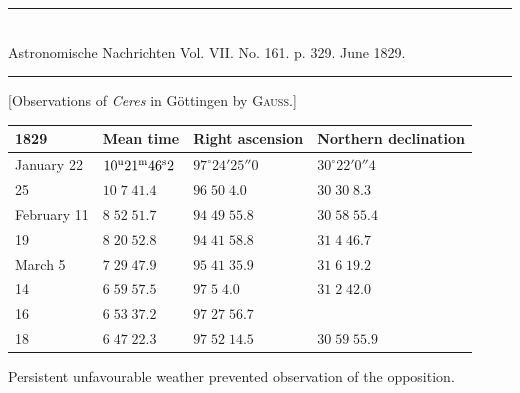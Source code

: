 \clearpage
{}
\begin{center}
\rule{0.55\linewidth}{0.4pt}\\[2pt]
Astronomische Nachrichten Vol. VII. No. 161. p. 329. June 1829.\\[2pt]
\rule{0.55\linewidth}{0.4pt}
\end{center}

\begin{center}[Observations of \emph{Ceres} in Göttingen by \textsc{Gauss.}]\end{center}

\begin{center}
\begin{tabular}{l|l|l|l}
1829 & Mean time & Right ascension & Northern declination \\
\hline
January 22 & $10^{\rm u}21^{\rm m}46^{\rm s}2$ & $97^\circ24'25''0$ & $30^\circ22'0''4$ \\
\hfill 25 & $10\;7\;41.4$ & $96\;50\;4.0$ & $30\;30\;8.3$ \\
February 11 & $8\;52\;51.7$ & $94\;49\;55.8$ & $30\;58\;55.4$ \\
\hfill 19 & $8\;20\;52.8$ & $94\;41\;58.8$ & $31\;4\;46.7$ \\
March 5 & $7\;29\;47.9$ & $95\;41\;35.9$ & $31\;6\;19.2$ \\
\hfill 14 & $6\;59\;57.5$ & $97\;5\;4.0$ & $31\;2\;42.0$ \\
\hfill 16 & $6\;53\;37.2$ & $97\;27\;56.7$ & \\
\hfill 18 & $6\;47\;22.3$ & $97\;52\;14.5$ & $30\;59\;55.9$ \\
\end{tabular}
\end{center}

Persistent unfavourable weather prevented observation of the opposition.

